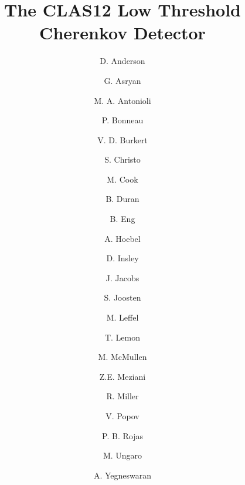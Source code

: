 \title{The CLAS12 Low Threshold Cherenkov Detector}


\author[A]{D. Anderson}     %
\author[A]{G. Asryan}       %
\author[A]{M. A. Antonioli} %
\author[A]{P. Bonneau}      %
\author[A]{V. D. Burkert}   %
\author[A]{S. Christo}      %
\author[A]{M. Cook}         %
\author[B]{B. Duran}        %
\author[A]{B. Eng}          %
\author[A]{A. Hoebel}       %
\author[A]{D. Insley}       %
\author[A]{J. Jacobs}       %
\author[C]{S. Joosten}      %
\author[A]{M. Leffel}       %
\author[A]{T. Lemon}        %
\author[A]{M. McMullen}     %
\author[C]{Z.E. Meziani}    %
\author[A]{R. Miller}       %
\author[A]{V. Popov}        %
\author[A]{P. B. Rojas}     %
\author[A]{M. Ungaro}       %
\author[A]{A. Yegneswaran}  %


\address[A]{Thomas Jefferson National Accelerator Facility, Newport News, VA, USA}
\address[B]{Temple University, Philadelphia, PA, USA}
\address[C]{Argonne National Laboratory, Lemont, IL, USA}
